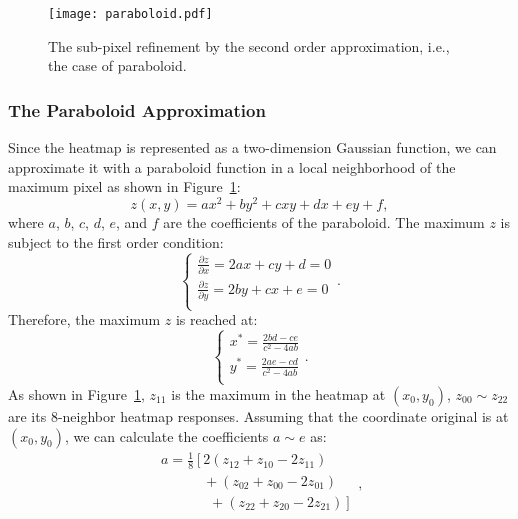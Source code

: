 \documentclass[twocolumn]{svjour3}          \smartqed  \usepackage{natbib}
\begin{document}
\begin{figure}[t]
\centering
\texttt{[image: paraboloid.pdf]}
\caption{The sub-pixel refinement by the second order approximation, i.e., the case of paraboloid.}
\label{fig:paraboloid}
\end{figure}

\subsubsection{The Paraboloid Approximation}
\label{subsec:paraboloid}
Since the heatmap is represented as a two-dimension Gaussian function, we can approximate it with a paraboloid function in a local neighborhood of the maximum pixel as shown in Figure~\ref{fig:paraboloid}:
\begin{equation}
z \left( x, y \right) = ax^2 + by^2 + cxy + dx + ey + f,
\label{eq:paraboloid}
\end{equation}
where $a$, $b$, $c$, $d$, $e$, and $f$ are the coefficients of the paraboloid. The maximum $z$ is subject to the first order condition:
\begin{equation}
\left\{ \begin{array}{l}
 \frac{{\partial z}}{{\partial x}} = 2ax + cy + d = 0 \\
 \frac{{\partial z}}{{\partial y}} = 2by + cx + e = 0 \\
 \end{array} \right..
\label{eq:gradient2}
\end{equation}
Therefore, the maximum $z$ is reached at:
\begin{equation}
\left\{ \begin{array}{l}
 {x^*} = \frac{{2bd - ce}}{{{c^2} - 4ab}} \\
 {y^*} = \frac{{2ae - cd}}{{{c^2} - 4ab}} \\
 \end{array} \right..
\label{eq:optimal2}
\end{equation}
As shown in Figure~\ref{fig:paraboloid}, $z_{11}$ is the maximum in the heatmap at $\left( x_0, y_0 \right)$, $z_{00} \sim z_{22}$ are its 8-neighbor heatmap responses. Assuming that the coordinate original is at $\left( x_0, y_0 \right)$, we can calculate the coefficients $a\sim e$ as:
\begin{equation}
\begin{array}{c}
 a = \frac{1}{8}\left[ {2\left( {{z_{12}} + {z_{10}} - 2{z_{11}}} \right)} \right. \\
  \qquad \quad + \left( {{z_{02}} + {z_{00}} - 2{z_{01}}} \right) \\
  \qquad \quad \ \ + \left. {\left( {{z_{22}} + {z_{20}} - 2{z_{21}}} \right)} \right] \\
 \end{array},
\label{eq:a}
\end{equation}
\end{document}
